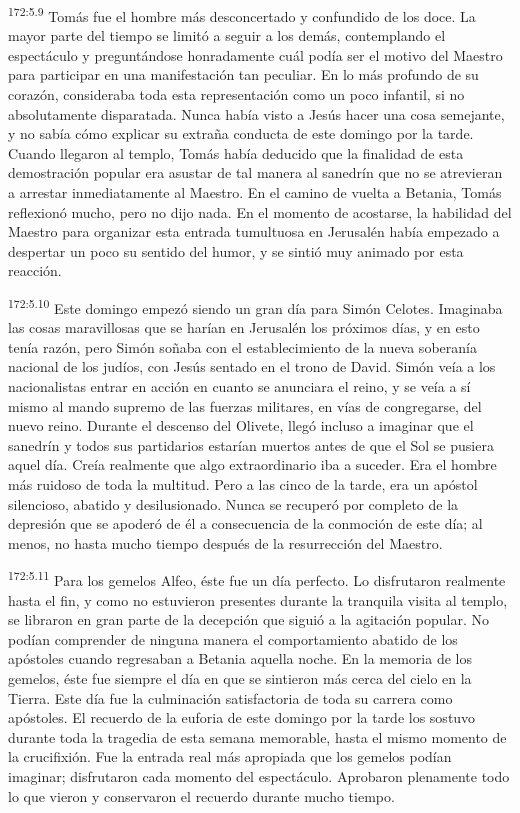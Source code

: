 \par 
\textsuperscript{172:5.9} Tomás fue el hombre más desconcertado y confundido de los doce. La mayor parte del tiempo se limitó a seguir a los demás, contemplando el espectáculo y preguntándose honradamente cuál podía ser el motivo del Maestro para participar en una manifestación tan peculiar. En lo más profundo de su corazón, consideraba toda esta representación como un poco infantil, si no absolutamente disparatada. Nunca había visto a Jesús hacer una cosa semejante, y no sabía cómo explicar su extraña conducta de este domingo por la tarde. Cuando llegaron al templo, Tomás había deducido que la finalidad de esta demostración popular era asustar de tal manera al sanedrín que no se atrevieran a arrestar inmediatamente al Maestro. En el camino de vuelta a Betania, Tomás reflexionó mucho, pero no dijo nada. En el momento de acostarse, la habilidad del Maestro para organizar esta entrada tumultuosa en Jerusalén había empezado a despertar un poco su sentido del humor, y se sintió muy animado por esta reacción.

\par 
\textsuperscript{172:5.10} Este domingo empezó siendo un gran día para Simón Celotes. Imaginaba las cosas maravillosas que se harían en Jerusalén los próximos días, y en esto tenía razón, pero Simón soñaba con el establecimiento de la nueva soberanía nacional de los judíos, con Jesús sentado en el trono de David. Simón veía a los nacionalistas entrar en acción en cuanto se anunciara el reino, y se veía a sí mismo al mando supremo de las fuerzas militares, en vías de congregarse, del nuevo reino. Durante el descenso del Olivete, llegó incluso a imaginar que el sanedrín y todos sus partidarios estarían muertos antes de que el Sol se pusiera aquel día. Creía realmente que algo extraordinario iba a suceder. Era el hombre más ruidoso de toda la multitud. Pero a las cinco de la tarde, era un apóstol silencioso, abatido y desilusionado. Nunca se recuperó por completo de la depresión que se apoderó de él a consecuencia de la conmoción de este día; al menos, no hasta mucho tiempo después de la resurrección del Maestro.

\par 
\textsuperscript{172:5.11} Para los gemelos Alfeo, éste fue un día perfecto. Lo disfrutaron realmente hasta el fin, y como no estuvieron presentes durante la tranquila visita al templo, se libraron en gran parte de la decepción que siguió a la agitación popular. No podían comprender de ninguna manera el comportamiento abatido de los apóstoles cuando regresaban a Betania aquella noche. En la memoria de los gemelos, éste fue siempre el día en que se sintieron más cerca del cielo en la Tierra. Este día fue la culminación satisfactoria de toda su carrera como apóstoles. El recuerdo de la euforia de este domingo por la tarde los sostuvo durante toda la tragedia de esta semana memorable, hasta el mismo momento de la crucifixión. Fue la entrada real más apropiada que los gemelos podían imaginar; disfrutaron cada momento del espectáculo. Aprobaron plenamente todo lo que vieron y conservaron el recuerdo durante mucho tiempo.

